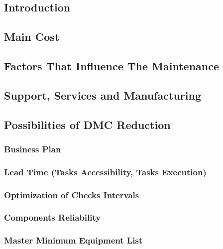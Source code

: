 ﻿%
\subsection{Introduction}
    

\subsection{Main Cost}
    

\subsection{Factors That Influence The Maintenance}
    

\subsection{Support, Services and Manufacturing}
    

\subsection{Possibilities of DMC Reduction}
    
    \subsubsection{Business Plan}
        
    \subsubsection{Lead Time (Tasks Accessibility, Tasks Execution)}
        
    \subsubsection{Optimization of Checks Intervals}
        
    \subsubsection{Components Reliability}
        
    \subsubsection{Master Minimum Equipment List}
        


